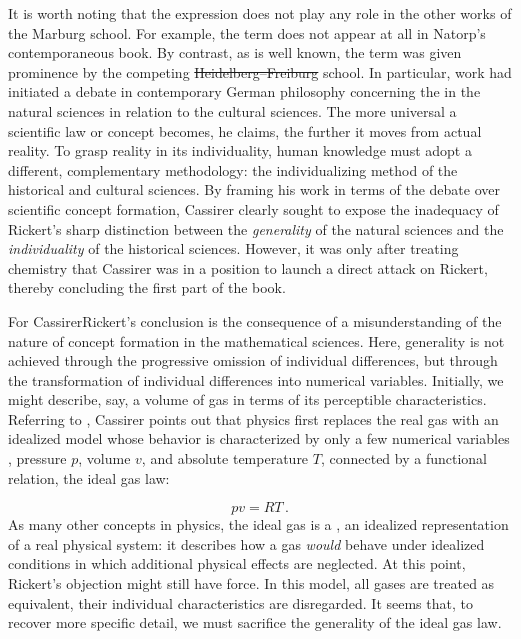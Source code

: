\documentclass[submitted,12pt]{article}
\providecommand{\DIFadd}[1]{{\protect\color{blue}\uwave{#1}}} %
\providecommand{\DIFdel}[1]{{\protect\color{red}\sout{#1}}}                      %
\providecommand{\DIFaddbegin}{} %
\providecommand{\DIFaddend}{} %
\providecommand{\DIFdelbegin}{} %
\providecommand{\DIFdelend}{} %
\begin{document}
It is worth noting that the expression   does not play any role in the other works of the Marburg school. For example, the term does not appear at all in Natorp's contemporaneous \citeyear{Natorp1910a} book. By contrast, as is well known, the term was given prominence by the competing \DIFdelbegin \DIFdel{Heidelberg--Freiburg }\DIFdelend \DIFaddbegin \DIFadd{Southwest }\DIFaddend school. In particular,  work had initiated a debate in contemporary German philosophy concerning the  in the natural sciences in relation to the cultural sciences. The more universal a scientific law or concept becomes, he claims, the further it moves from actual reality. To grasp reality in its individuality, human knowledge must adopt a different, complementary methodology: the individualizing method of the historical and cultural sciences. By framing his work in terms of the debate over scientific concept formation, Cassirer clearly sought to expose the inadequacy of Rickert's sharp distinction between the \emph{generality} of the natural sciences and the \emph{individuality} of the historical sciences. However, it was only after treating chemistry that Cassirer was in a position to launch a direct attack on Rickert, thereby concluding the first part of the book.

For Cassirer\DIFaddbegin \DIFadd{, }\DIFaddend Rickert's conclusion is the consequence of a misunderstanding of the nature of concept formation in the mathematical sciences. Here, generality is not achieved through the progressive omission of individual differences, but through the transformation of individual differences into numerical variables. Initially, we might describe, say, a volume of gas in terms of its perceptible characteristics. Referring to \citet{Duhem1906}, Cassirer points out that physics first replaces the real gas with an idealized model whose behavior is characterized by only a few numerical variables , pressure $p$, volume $v$, and absolute temperature $T$, connected by a functional relation, the ideal gas law:  

\begin{equation*}
pv=RT\,.  
\end{equation*}
%
As many other concepts in physics, the ideal gas is a \DIFdelbegin %
\DIFdelend \DIFaddbegin {} \DIFadd{(}\emph{\DIFadd{Grenzbegriff}}\DIFadd{) }\DIFaddend {}, an idealized representation of a real physical system: it describes how a gas \emph{would} behave under idealized conditions in which additional physical effects are neglected. At this point, Rickert's objection might still have force. In this model, all gases are treated as equivalent, their individual characteristics are disregarded. It seems that, to recover more specific detail, we must sacrifice the generality of the ideal gas law.
\end{document}
